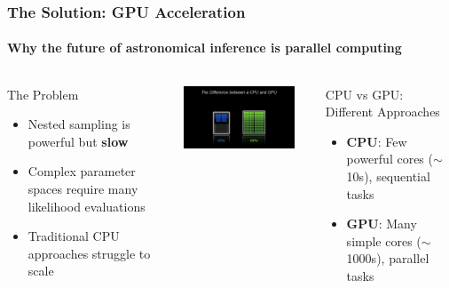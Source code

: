\documentclass[aspectratio=169]{beamer}
\begin{document}

\begin{frame}
    \frametitle{The Solution: GPU Acceleration}
    \framesubtitle{Why the future of astronomical inference is parallel computing}
    \begin{columns}
        \begin{block}{The Problem}
            \begin{itemize}
                \item Nested sampling is powerful but \textbf{slow}
                \item Complex parameter spaces require many likelihood evaluations
                \item Traditional CPU approaches struggle to scale
            \end{itemize}
        \end{block}

        \begin{center}
            \includegraphics[width=0.9\textwidth]{figures/gpu_vs_cpu.jpg}
        \end{center}

        \vspace{-1em}
        \begin{block}{CPU vs GPU: Different Approaches}
            \begin{itemize}
                \item \textbf{CPU}: Few powerful cores ($\sim$10s), sequential tasks
                \item \textbf{GPU}: Many simple cores ($\sim$1000s), parallel tasks
            \end{itemize}
        \end{block}
        \vspace{-0.5em}


\end{columns}
\end{frame}
\end{document}
